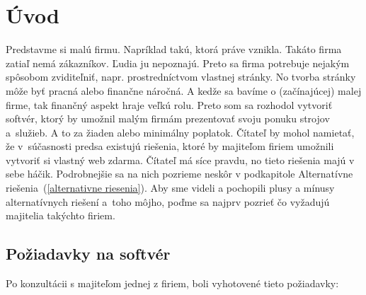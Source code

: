 \chapter*{Úvod}

Predstavme si malú firmu. Napríklad takú, ktorá práve vznikla. Takáto firma zatiaľ nemá zákazníkov. Ľudia ju nepoznajú. Preto sa firma potrebuje nejakým spôsobom zviditeľniť, napr. prostredníctvom vlastnej stránky. No tvorba stránky môže byť pracná alebo finančne náročná. A kedže sa bavíme o (začínajúcej) malej firme, tak finančný aspekt hraje veľkú rolu. Preto som sa rozhodol vytvoriť softvér, ktorý by umožnil malým firmám prezentovať svoju ponuku strojov a~služieb. A to za žiaden alebo minimálny poplatok. Čítateľ by mohol namietať, že v~súčasnosti predsa existujú riešenia, ktoré by majiteľom firiem umožnili vytvoriť si vlastný web zdarma. Čítateľ má síce pravdu, no tieto riešenia majú v sebe háčik. Podrobnejšie sa na nich pozrieme neskôr v podkapitole Alternatívne riešenia~(\ref{alternativne riesenia}). Aby sme videli a pochopili plusy a mínusy alternatívnych riešení a~toho môjho, poďme sa najprv pozrieť čo vyžadujú majitelia takýchto firiem.

\section{Požiadavky na softvér}
\label{poziadavky}

Po konzultácii s majiteľom jednej z firiem, boli vyhotovené tieto požiadavky:


